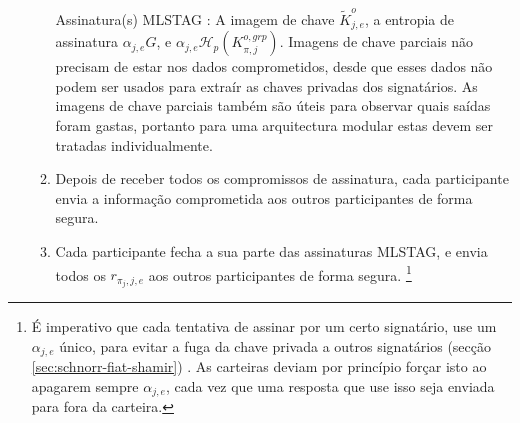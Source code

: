 \begin{enumerate}
\begin{enumerate}
        Assinatura(s) MLSTAG : A imagem de chave $\tilde{K}^{o}_{j,e}$, a entropia de assinatura $\alpha_{j,e} G$, e $\alpha_{j,e} \mathcal{H}_p(K^{o,grp}_{\pi,j})$. Imagens de chave parciais não precisam de estar nos dados comprometidos, desde que esses dados não podem ser usados para extraír as chaves privadas dos signatários. As imagens de chave parciais também são úteis para observar quais saídas foram gastas, portanto para uma arquitectura modular estas devem ser tratadas individualmente.
        \item Depois de receber todos os compromissos de assinatura, cada participante envia a informação comprometida aos outros participantes de forma segura. 
        \item Cada participante fecha a sua parte das assinaturas MLSTAG, e envia todos os $r_{{\pi_j},j,e}$ aos outros participantes de forma segura.
\footnote{É imperativo que cada tentativa de assinar por um certo signatário, use um $\alpha_{j,e}$ único, para evitar a fuga da chave privada a outros signatários (secção \ref{sec:schnorr-fiat-shamir}) \cite{MRL-0009-multisig}. As carteiras deviam por princípio forçar isto ao apagarem sempre $\alpha_{j,e}$, cada vez que uma resposta que use isso seja enviada para fora da carteira.}   
    \end{enumerate}
\end{enumerate}


